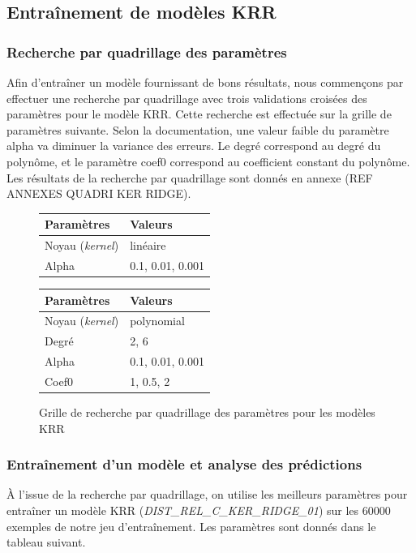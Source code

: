 \subsection{Entraînement de modèles KRR}

\subsubsection{Recherche par quadrillage des paramètres}
Afin d'entraîner un modèle fournissant de bons résultats, nous commençons par effectuer une recherche par quadrillage avec trois validations croisées des paramètres pour le modèle KRR. Cette recherche est effectuée sur la grille de paramètres suivante. Selon la documentation, une valeur faible du paramètre alpha va diminuer la variance des erreurs. Le degré correspond au degré du polynôme, et le paramètre coef0 correspond au coefficient constant du polynôme. Les résultats de la recherche par quadrillage sont donnés en annexe (REF ANNEXES QUADRI KER RIDGE).

\begin{figure}[!h]
	\centering
	
	\begin{tabular}{|l|l|}
		\hline
		\textbf{Paramètres} & \textbf{Valeurs} \\ \hline 
		Noyau (\emph{kernel}) & linéaire\\ \hline
		Alpha & 0.1, 0.01, 0.001 \\ \hline
	\end{tabular}
	
	\vspace{0.5cm}	

	\begin{tabular}{|l|l|}
		\hline
		\textbf{Paramètres} & \textbf{Valeurs} \\ \hline 
		Noyau (\emph{kernel}) & polynomial\\ \hline
		Degré & 2, 6 \\ \hline
		Alpha & 0.1, 0.01, 0.001 \\ \hline
		Coef0 & 1, 0.5, 2 \\ \hline
	\end{tabular}		
	
	\caption{Grille de recherche par quadrillage des paramètres pour les modèles KRR}
\end{figure}

\subsubsection{Entraînement d'un modèle et analyse des prédictions}
\par À l'issue de la recherche par quadrillage, on utilise les meilleurs paramètres pour entraîner un modèle KRR (\emph{DIST\_REL\_C\_KER\_RIDGE\_01}) sur les 60000 exemples de notre jeu d'entraînement. Les paramètres sont donnés dans le tableau suivant.

